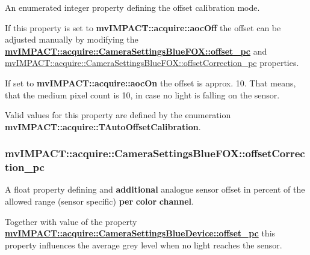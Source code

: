 An enumerated integer property defining the offset calibration mode. 

If this property is set to {\bfseries mv\+I\+M\+P\+A\+C\+T\+::acquire\+::aoc\+Off} the offset can be adjusted manually by modifying the {\bfseries \hyperlink{classmv_i_m_p_a_c_t_1_1acquire_1_1_camera_settings_blue_device_aa3bbc947f98f3182b8bd0121a511b1c2}{mv\+I\+M\+P\+A\+C\+T\+::acquire\+::\+Camera\+Settings\+Blue\+F\+O\+X\+::offset\+\_\+pc}} and \hyperlink{classmv_i_m_p_a_c_t_1_1acquire_1_1_camera_settings_blue_f_o_x_a8c4f9f618485d3be2c952343f584bbc5}{mv\+I\+M\+P\+A\+C\+T\+::acquire\+::\+Camera\+Settings\+Blue\+F\+O\+X\+::offset\+Correction\+\_\+pc} properties.

If set to {\bfseries mv\+I\+M\+P\+A\+C\+T\+::acquire\+::aoc\+On} the offset is approx. 10. That means, that the medium pixel count is 10, in case no light is falling on the sensor.

Valid values for this property are defined by the enumeration {\bfseries mv\+I\+M\+P\+A\+C\+T\+::acquire\+::\+T\+Auto\+Offset\+Calibration}. \hypertarget{classmv_i_m_p_a_c_t_1_1acquire_1_1_camera_settings_blue_f_o_x_a8c4f9f618485d3be2c952343f584bbc5}{
\subsubsection[{offset\+Correction\+\_\+pc}]{ mv\+I\+M\+P\+A\+C\+T\+::acquire\+::\+Camera\+Settings\+Blue\+F\+O\+X\+::offset\+Correction\+\_\+pc}}\label{classmv_i_m_p_a_c_t_1_1acquire_1_1_camera_settings_blue_f_o_x_a8c4f9f618485d3be2c952343f584bbc5}


A float property defining and {\bfseries additional} analogue sensor offset in percent of the allowed range (sensor specific) {\bfseries per} {\bfseries color} {\bfseries channel}. 

Together with value of the property {\bfseries \hyperlink{classmv_i_m_p_a_c_t_1_1acquire_1_1_camera_settings_blue_device_aa3bbc947f98f3182b8bd0121a511b1c2}{mv\+I\+M\+P\+A\+C\+T\+::acquire\+::\+Camera\+Settings\+Blue\+Device\+::offset\+\_\+pc}} this property influences the average grey level when no light reaches the sensor.

